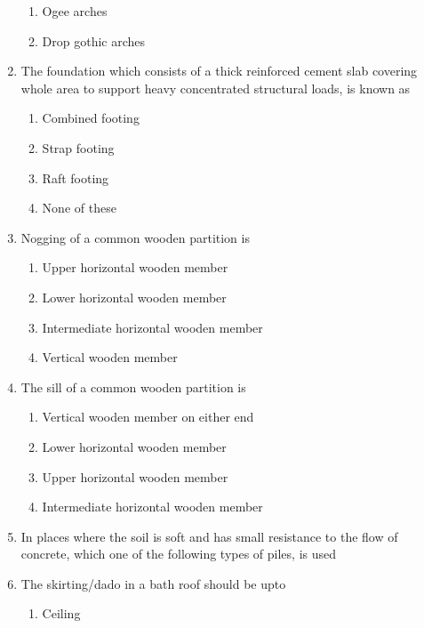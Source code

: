 \documentclass[11pt,a4paper]{article}
\begin{document}
\begin{enumerate}
\begin{enumerate}[label=\Alph*.]
\item{Ogee arches}
\item{Drop gothic arches}
\end{enumerate}
\item{The foundation which consists of a thick reinforced cement slab covering whole area to support heavy concentrated structural loads, is known as}
\begin{enumerate}[label=\Alph*.]
\item{Combined footing}
\item{Strap footing}
\item{Raft footing}
\item{None of these}
\end{enumerate}
\item{Nogging of a common wooden partition is}
\begin{enumerate}[label=\Alph*.]
\item{Upper horizontal wooden member}
\item{Lower horizontal wooden member}
\item{Intermediate horizontal wooden member}
\item{Vertical wooden member}
\end{enumerate}
\item{The sill of a common wooden partition is}
\begin{enumerate}[label=\Alph*.]
\item{Vertical wooden member on either end}
\item{Lower horizontal wooden member}
\item{Upper horizontal wooden member}
\item{Intermediate horizontal wooden member}
\end{enumerate}
\item{In places where the soil is soft and has small resistance to the flow of concrete, which one of the following types of piles, is used}
\\
\item{The skirting/dado in a bath roof should be upto}
\begin{enumerate}[label=\Alph*.]
\item{Ceiling}

\end{enumerate}
\end{enumerate}
\end{document}
